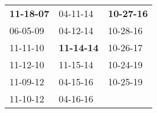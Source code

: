 \begin{supertabular}{p{0.33\columnwidth}p{0.33\columnwidth}p{0.33\columnwidth}}
 \textbf{11-18-07\textsuperscript{}} &           04-11-14\textsuperscript{} &  \textbf{10-27-16\textsuperscript{}} \\
          06-05-09\textsuperscript{} &           04-12-14\textsuperscript{} &           10-28-16\textsuperscript{} \\
          11-11-10\textsuperscript{} &  \textbf{11-14-14\textsuperscript{}} &           10-26-17\textsuperscript{} \\
          11-12-10\textsuperscript{} &           11-15-14\textsuperscript{} &           10-24-19\textsuperscript{} \\
          11-09-12\textsuperscript{} &           04-15-16\textsuperscript{} &           10-25-19\textsuperscript{} \\
          11-10-12\textsuperscript{} &           04-16-16\textsuperscript{} &                                      \\
\end{supertabular}
